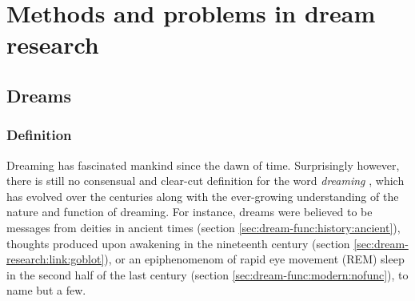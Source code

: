 \cleardoublepage

\chapter{Methods and problems in dream research}
\label{sec:dream-research}


\section{Dreams}
\label{sec:dream-research:dreams}

\subsection{Definition}
\label{sec:dream-research:dreams:definition}

Dreaming has fascinated mankind since the dawn of time. Surprisingly however, there is still no consensual and clear-cut definition for the word \emph{dreaming} \citep{pagel_definitions_2001}, which has evolved over the centuries along with the ever-growing understanding of the nature and function of dreaming. For instance, dreams were believed to be messages from deities in ancient times (section \ref{sec:dream-func:history:ancient}), thoughts produced upon awakening in the nineteenth century (section \ref{sec:dream-research:link:goblot}), or an epiphenomenom of rapid eye movement (REM) sleep in the second half of the last century (section \ref{sec:dream-func:modern:nofunc}), to name but a few.

